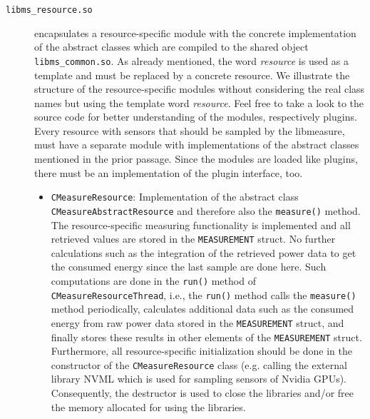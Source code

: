 \begin{description}
	\item[\texttt{libms\_resource.so}] encapsulates a resource-specific module with the concrete implementation of the abstract classes which are compiled to the shared object \texttt{libms\_common.so}. As already mentioned, the word \textit{resource} is used as a template and must be replaced by a concrete resource. We  illustrate the structure of the resource-specific modules without considering the real class names but using the template word \textit{resource}. Feel free to take a look to the source code for better understanding of the modules, respectively plugins.\\
	Every resource with sensors that should be sampled by the libmeasure, must have a separate module with implementations of the abstract classes mentioned in the prior passage. Since the modules are loaded like plugins, there must be an implementation of the plugin interface, too.
	\begin{itemize}
		\item \texttt{CMeasureResource}: Implementation of the abstract class\\\texttt{CMeasureAbstractResource} and therefore also the \texttt{measure()} method. The resource-specific measuring functionality is implemented and all retrieved values are stored in the \texttt{MEASUREMENT} struct. No further calculations such as the integration of the retrieved power data to get the consumed energy since the last sample are done here. Such computations are done in the \texttt{run()} method of \texttt{CMeasureResourceThread}, i.e., the \texttt{run()} method calls the \texttt{measure()} method periodically, calculates additional data such as the consumed energy from raw power data stored in the \texttt{MEASUREMENT} struct, and finally stores these results in other elements of the \texttt{MEASUREMENT} struct. Furthermore, all resource-specific initialization should be done in the constructor of the \texttt{CMeasureResource} class (e.g. calling the external library NVML which is used for sampling sensors of Nvidia GPUs). Consequently, the destructor is used to close the libraries and/or free the memory allocated for using the libraries.\\
		

\end{itemize}
\end{description}
